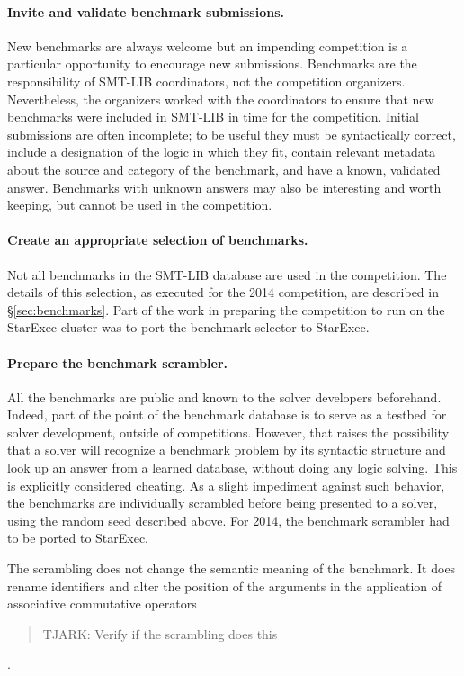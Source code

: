 \documentclass[twoside,11pt]{article}
\newcommand{\comment}[2]{\begin{quote}\sc #1\marginpar{\textcolor{red}{$\ast^{\mbox{#2}}$}}\end{quote}}
\newcommand{\davidc}[1]{\comment{#1}{DC}}
\begin{document}
\paragraph{Invite and validate benchmark submissions.} New benchmarks are always welcome but an impending competition is a particular opportunity to encourage new submissions. Benchmarks are the responsibility of SMT-LIB coordinators, not the competition organizers. Nevertheless, the organizers worked with the coordinators to ensure that new benchmarks were included in SMT-LIB in time for the competition. Initial submissions are often incomplete; to be useful they must be syntactically correct, include a designation of the logic in which they fit, contain relevant metadata about the source and category of the benchmark, and have a known, validated answer. Benchmarks with unknown answers may also be interesting and worth keeping, but cannot be used in the competition.

\paragraph{Create an appropriate selection of benchmarks.} Not all benchmarks in the SMT-LIB database are used in the competition. The details of this selection, as executed for the 2014 competition, are described in \S\ref{sec:benchmarks}. Part of the work in preparing the competition to run on the StarExec cluster was to port the benchmark selector to StarExec.

\paragraph{Prepare the benchmark scrambler.} All the benchmarks are public and known to the solver developers beforehand. Indeed, part of the point of the benchmark database is to serve as a testbed for solver development, outside of competitions. However, that raises the possibility that a solver will recognize a benchmark problem by its syntactic structure and look up an answer from a learned database, without doing any logic solving. This is explicitly considered cheating. As a slight impediment against such behavior, the benchmarks are individually scrambled before being presented to a solver, using the random seed described above. For 2014, the benchmark scrambler had to be ported to StarExec.

The scrambling does not change the semantic meaning of the benchmark. It does rename identifiers and alter the position of the arguments in the application of associative commutative operators\davidc{TJARK: Verify if the scrambling does this}.
\end{document}
